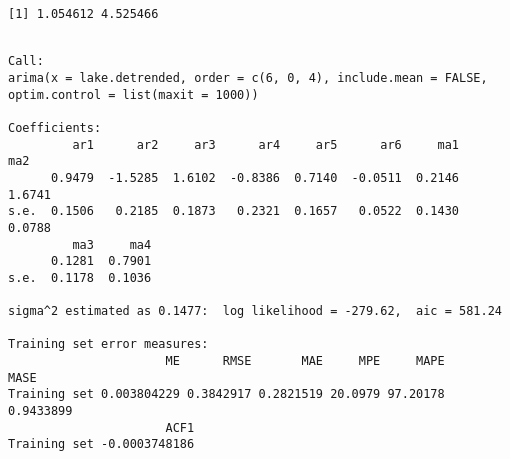 \documentclass[]{book}
\newenvironment{Shaded}{\begin{snugshade}}{\end{snugshade}}
\newcommand{\CommentTok}[1]{\textcolor[rgb]{0.56,0.35,0.01}{\textit{#1}}}
\newcommand{\DataTypeTok}[1]{\textcolor[rgb]{0.13,0.29,0.53}{#1}}
\newcommand{\DecValTok}[1]{\textcolor[rgb]{0.00,0.00,0.81}{#1}}
\newcommand{\KeywordTok}[1]{\textcolor[rgb]{0.13,0.29,0.53}{\textbf{#1}}}
\newcommand{\NormalTok}[1]{#1}
\newcommand{\OperatorTok}[1]{\textcolor[rgb]{0.81,0.36,0.00}{\textbf{#1}}}
\newcommand{\OtherTok}[1]{\textcolor[rgb]{0.56,0.35,0.01}{#1}}
\newcommand{\StringTok}[1]{\textcolor[rgb]{0.31,0.60,0.02}{#1}}
\begin{document}
\begin{Shaded}
\end{Shaded}

\begin{verbatim}
[1] 1.054612 4.525466
\end{verbatim}

\begin{Shaded}
\end{Shaded}

\begin{verbatim}

Call:
arima(x = lake.detrended, order = c(6, 0, 4), include.mean = FALSE, optim.control = list(maxit = 1000))

Coefficients:
         ar1      ar2     ar3      ar4     ar5      ar6     ma1     ma2
      0.9479  -1.5285  1.6102  -0.8386  0.7140  -0.0511  0.2146  1.6741
s.e.  0.1506   0.2185  0.1873   0.2321  0.1657   0.0522  0.1430  0.0788
         ma3     ma4
      0.1281  0.7901
s.e.  0.1178  0.1036

sigma^2 estimated as 0.1477:  log likelihood = -279.62,  aic = 581.24

Training set error measures:
                      ME      RMSE       MAE     MPE     MAPE      MASE
Training set 0.003804229 0.3842917 0.2821519 20.0979 97.20178 0.9433899
                      ACF1
Training set -0.0003748186
\end{verbatim}
\end{document}
